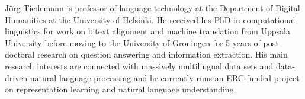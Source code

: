 Jörg Tiedemann is professor of language technology at the Department of Digital Humanities at the University of Helsinki.
He received his PhD in computational linguistics for work on bitext alignment and machine translation from Uppsala University before moving to the University of Groningen for 5 years of post-doctoral research on question answering and information extraction.
His main research interests are connected with massively multilingual data sets and data-driven natural language processing and he currently runs an ERC-funded project on representation learning and natural language understanding.